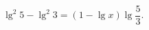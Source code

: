 \begin{ex}[type=equation]
	\begin{condition}
		$\lg^2 5 - \lg^2 3 = (1 - \lg x)\lg \dfrac{5}{3}.$
	\end{condition}
\end{ex}